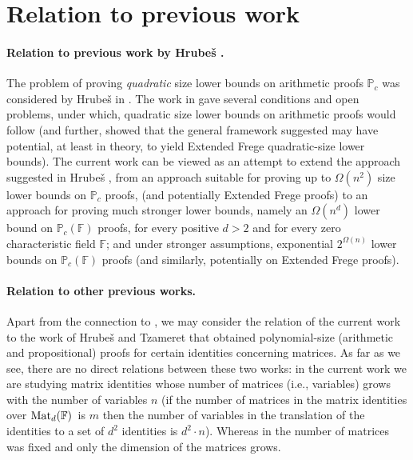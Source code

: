 \documentclass[12pt,reqno]{article}
\newcommand\F{\ensuremath{\mathbb F}}
\newcommand\PP{{\mathbb P}}
\newcommand\PC{\ensuremath{\PP_c}}
\newcommand{\cd}{\cdot}
\newcommand {\para}[1] {\paragraph{#1}}
\newcommand{\matd}{{\ensuremath{{\rm Mat}_d(\F)}}}
\begin{document}
%
\section{Relation to previous work}
\para{Relation to previous work by Hrube\v s \cite{Hru11}.}
The problem of proving \textit{quadratic} size lower bounds on arithmetic proofs $\PC$ was considered by Hrube\v{s} in \cite{Hru11}. The work in \cite{Hru11} gave several conditions and open problems, under which, quadratic size lower bounds on arithmetic proofs would follow (and further, showed that the general framework suggested may have potential, at least in theory, to yield Extended Frege quadratic-size lower bounds). The current work can be viewed as an attempt to extend the approach suggested in Hrube\v s \cite{Hru11}, from an approach suitable for proving up to  $\Omega(n^2)$ size lower bounds on $\PC$ proofs, (and potentially Extended Frege proofs) to an approach for proving much stronger lower bounds,  namely an $\Omega(n^d)$ lower bound on $\PC(\F)$ proofs, for every positive $d>2$ and for every zero characteristic field $\F$; and under stronger assumptions, exponential  $2^{\Omega(n)}$  lower bounds on $\PC(\F)$ proofs (and  similarly, potentially on Extended Frege proofs).

\para{Relation to other previous works.}
Apart from the connection to  \cite{Hru11}, we may consider the relation of the current work to the work of  Hrube\v{s} and Tzameret \cite{HT12} that obtained polynomial-size  (arithmetic and propositional) proofs for certain identities concerning matrices. As far as we see, there are no direct relations between these two works: in the current work we are studying matrix identities whose number of matrices (i.e., variables) grows with the number of variables $n$ (if the number of matrices in the matrix identities over \matd\ is $m$ then the number of variables in the translation of the identities to a set of $d^2$ identities is $d^2\cd n$).
 Whereas in \cite{HT12} the number of matrices was fixed and only the dimension of the matrices grows.
\end{document}
